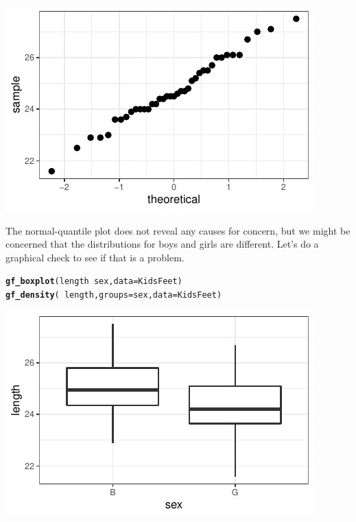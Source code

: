 \documentclass[twoside]{book}\usepackage[]{graphicx}\usepackage[]{xcolor}
\makeatletter
\def\maxwidth{ %
  \ifdim\Gin@nat@width>\linewidth
    \linewidth
  \else
    \Gin@nat@width
  \fi
}
\newcommand{\hlopt}[1]{\textcolor[rgb]{0,0,0}{#1}}%
\newcommand{\hlstd}[1]{\textcolor[rgb]{0.345,0.345,0.345}{#1}}%
\newcommand{\hlkwc}[1]{\textcolor[rgb]{0.333,0.667,0.333}{#1}}%
\newcommand{\hlkwd}[1]{\textcolor[rgb]{0.737,0.353,0.396}{\textbf{#1}}}%
\newenvironment{kframe}{%
 \def\at@end@of@kframe{}%
 \ifinner\ifhmode%
  \def\at@end@of@kframe{\end{minipage}}%
  \begin{minipage}{\columnwidth}%
 \fi\fi%
 \def\FrameCommand##1{\hskip\@totalleftmargin \hskip-\fboxsep
 \colorbox{shadecolor}{##1}\hskip-\fboxsep
     \hskip-\linewidth \hskip-\@totalleftmargin \hskip\columnwidth}%
 \MakeFramed {\advance\hsize-\width
   \@totalleftmargin\z@ \linewidth\hsize
   \@setminipage}}%
 {\par\unskip\endMakeFramed%
 \at@end@of@kframe}
\newenvironment{knitrout}{}{} %
\makeatother
\begin{document}
\begin{solution}
\begin{knitrout}
{\centering \includegraphics[width=\maxwidth]{figures/fig-unnamed-chunk-168-1} 

}



\end{knitrout}
The normal-quantile plot does not reveal any causes for concern, but 
we might be concerned that the distributions for boys and girls are different.  Let's do
a graphical check to see if that is a problem.
\begin{knitrout}
\color{fgcolor}\begin{kframe}
\begin{alltt}
\hlkwd{gf_boxplot}\hlstd{(length} \hlopt{~} \hlstd{sex,} \hlkwc{data} \hlstd{= KidsFeet)}
\hlkwd{gf_density}\hlstd{(} \hlopt{~} \hlstd{length,} \hlkwc{groups} \hlstd{= sex,} \hlkwc{data} \hlstd{= KidsFeet)}
\end{alltt}


{\ttfamily\noindent\bfseries\color{errorcolor}{\#\# Error in eval(x, env): object 'sex' not found}}\end{kframe}

{\centering \includegraphics[width=\maxwidth]{figures/fig-unnamed-chunk-169-1} 

}
\end{knitrout}
\end{solution}
\end{document}
